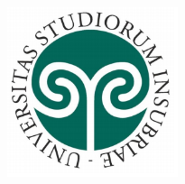     
    
    
    
    
        
    


\thispagestyle{empty}
\begin{center}
    \includegraphics[width=5cm]{Immagini/Loghi/Logoinsubria.png}
\end{center}

